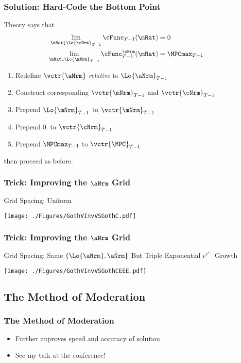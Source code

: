 \documentclass{beamer}
\begin{document}
\begin{frame}
\frametitle{Solution: Hard-Code the Bottom Point}

Theory says that
\begin{equation}\begin{gathered}\begin{aligned}
  \lim_{\mRat \downarrow \Lo{\mNrm}_{T-1}} \cFunc_{T-1}(\mRat)  & = 0
\\ \lim_{\mRat \downarrow \Lo{\mNrm}_{T-1}} \cFunc_{T-1}^{\mNrm}(\mRat)  & = \MPCmax_{T-1}
\end{aligned}\end{gathered}\end{equation}

\medskip 

\begin{enumerate}
\item Redefine $\vctr{\aNrm}$ {\it relative} to $\Lo{\aNrm}_{T-1}$
\item Construct corresponding $\vctr{\mNrm}_{T-1}$ and $\vctr{\cNrm}_{T-1}$
\item Prepend $\Lo{\mNrm}_{T-1}$ to $\vctr{\mNrm}_{T-1}$
\item Prepend $0.$ to $\vctr{\cNrm}_{T-1}$
\item Prepend $\MPCmax_{T-1}$ to $\vctr{\MPC}_{T-1}$
\end{enumerate}
then proceed as before.

\end{frame}

\begin{frame}
\frametitle{Trick: Improving the $\aNrm$ Grid}
Grid Spacing: Uniform

\texttt{[image: ./Figures/GothVInvVSGothC.pdf]}

\end{frame}


\begin{frame}
\frametitle{Trick: Improving the $\aNrm$ Grid}
Grid Spacing: Same $\{\Lo{\aNrm},\bar{\aNrm}\}$ But Triple Exponential $e^{e^{e^{...}}}$ Growth

\texttt{[image: ./Figures/GothVInvVSGothCEEE.pdf]}

\end{frame}


\subsection{The Method of Moderation}

\begin{frame}[label=MoM]
\frametitle{The Method of Moderation}

\begin{itemize}
\item Further improves speed and accuracy of solution
\item See my talk at the conference!
\end{itemize}

\end{frame}
\end{document}
